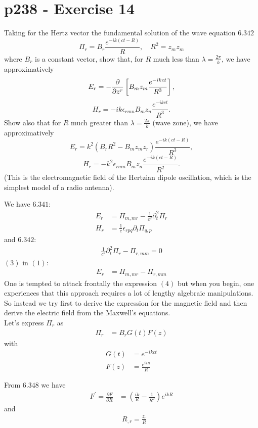 \section{p238 - Exercise 14}
\begin{tcolorbox}
Taking for the Hertz vector the fundamental solution of the wave equation $\mathbf{6.342}$
$$\Pi_r=B_r\frac{e^{-ik\left(ct-R\right)}}{R},\quad R^2=z_mz_m$$
where $B_r$ is a constant vector, show that, for $R$ much less than $\lambda=\frac{2\pi}{k}$, we have approximatively
$$E_r= -\pdv{}{z^r}\left[B_mz_m\frac{e^{-ikct}}{R^3}\right],$$
$$H_r= -ik\epsilon_{rmn}B_mz_n\frac{e^{-ikct}}{R^3}.$$
Show also that for $R$ much greater than $\lambda=\frac{2\pi}{k}$ (wave zone), we have approximatively
$$E_r= k^2\left(B_rR^2-B_mz_mz_r\right)\frac{e^{-ik(ct-R)}}{R^3},$$
$$H_r= -k^2\epsilon_{rmn}B_mz_n\frac{e^{-ik(ct-R)}}{R^2}.$$
(This is the electromagnetic field of the Hertzian dipole oscillation, which is the simplest model of a radio antenna).
\end{tcolorbox}
We have $\mathbf{6.341}$:
\begin{align}
E_r&= \Pi_{m,mr}-\frac{1}{c^2}\partial^2_t\Pi_r\\
H_r&= \frac{1}{c}\epsilon_{rpq}\partial_t\Pi_{q,p}
\end{align}
and $\mathbf{6.342}$:
\begin{align}
\frac{1}{c^2}\partial^2_t\Pi_r-\Pi_{r,mm}=0
\end{align}
$(3)$ in $(1)$:
\begin{align}
E_r&= \Pi_{m,mr}-\Pi_{r,mm}
\end{align}
One is tempted to attack frontally the expression $(4)$ but when you begin, one experiences that this approach requires a lot of lengthy algebraic manipulations. So instead we try first to derive the expression for the magnetic field and then derive the electric field from the Maxwell's equations.\\
Let's express $\Pi_r$ as 
\begin{align}
\Pi_r&= B_rG(t)F(z)
\end{align}
with
\\
\begin{align}
G(t)&=e^{-ikct}\\
F(z)&= \frac{e^{ikR}}{R}
\end{align}

From $\mathbf{6.348}$ we have
\begin{align}
F^{'} = \frac{\partial F}{\partial R}&= \left(\frac{ik}{R}-\frac{1}{R^2}\right)e^{ikR}
\end{align}
and 
\begin{align}
&R_{,r} = \frac{z_r}{R}
\end{align}


